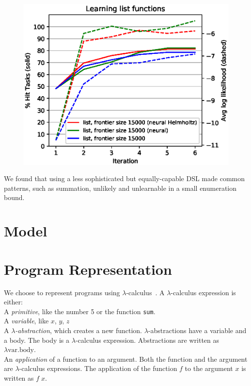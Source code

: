 \documentclass{article}
\begin{document}
\begin{figure}
  \includegraphics[width=\columnwidth]{figures/list.eps}
\end{figure}

We found that using a less sophisticated but equally-capable DSL made common
patterns, such as summation, unlikely and unlearnable in a small enumeration
bound.

\section{Model}









\pagebreak

\section{Program Representation}
We choose to represent programs using $\lambda$-calculus~\cite{pierce}.
A $\lambda$-calculus expression is either:
\\\noindent A \emph{primitive}, like the number 5 or
  the function \texttt{sum}.
\\\noindent A \emph{variable}, like $x$, $y$, $z$
\\\noindent A $\lambda$\emph{-abstraction}, which creates a new function. $\lambda$-abstractions have a variable and a body. The body is a $\lambda$-calculus expression. Abstractions are written as $\lambda \text{var}. \text{body}$.
\\\noindent An \emph{application} of a function to an argument. Both the function and the argument are $\lambda$-calculus expressions. The application of the function $f$ to the argument $x$ is written as $f\; x$.
\end{document}
